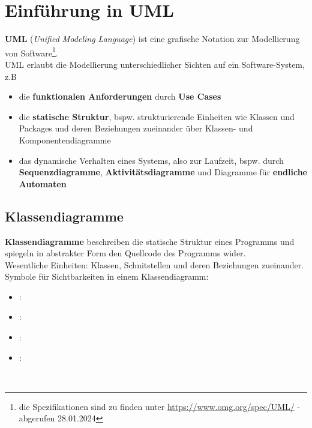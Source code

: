 \section{Einführung in UML}

\textbf{UML} (\textit{Unified Modeling Language}) ist eine grafische Notation zur Modellierung von Software\footnote{
die Spezifikationen sind zu finden unter \url{https://www.omg.org/spec/UML/} - abgerufen 28.01.2024
}.\\

\noindent
UML erlaubt die Modellierung unterschiedlicher Sichten auf ein Software-System, z.B

\begin{itemize}
    \item die \textbf{funktionalen Anforderungen} durch \textbf{Use Cases}
    \item die \textbf{statische Struktur}, {bspw.} strukturierende Einheiten wie Klassen und Packages und deren Beziehungen zueinander über Klassen- und Komponentendiagramme
    \item das dynamische Verhalten eines Systems, also zur Laufzeit, {bspw.} durch \textbf{Sequenzdiagramme}, \textbf{Aktivitätsdiagramme} und Diagramme für \textbf{endliche Automaten}
\end{itemize}
\noindent

\subsection{Klassendiagramme}

\textbf{Klassendiagramme} beschreiben die statische Struktur eines Programms und spiegeln in abstrakter Form den Quellcode des Programms wider.\\

\noindent
Wesentliche Einheiten: Klassen, Schnitstellen und deren Beziehungen zueinander.\\

\noindent
Symbole für Sichtbarkeiten in einem Klassendiagramm:

\begin{itemize}
    \item {}: \code{+}
    \item {}: \code{-}
    \item {}: \code{#}
    \item {}: \code{~}
\end{itemize}\\

